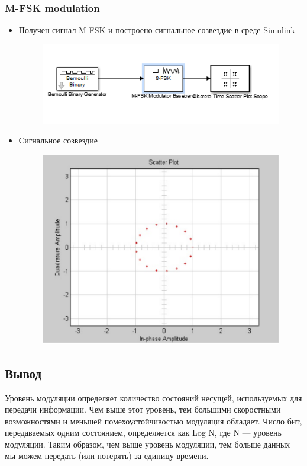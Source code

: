 \documentclass[10pt,a4paper]{article}
\begin{document}
\subsubsection{M-FSK modulation}
\begin{itemize}
\item Получен сигнал M-FSK и построено сигнальное созвездие в среде Simulink
\begin{figure}[h]
\centering
\includegraphics[width=12cm]{sim3_1.png} 
\end{figure}
\item Сигнальное созвездие
\begin{figure}[h]
\centering
\includegraphics[width=12cm]{sim3.png} 
\end{figure}
\end{itemize}
\subsection{Вывод}
Уровень модуляции определяет количество состояний несущей, используемых для передачи информации. Чем выше этот уровень, тем большими скоростными возможностями и меньшей помехоустойчивостью модуляция обладает. Число бит, передаваемых одним состоянием, 
определяется как Log N, где N — уровень модуляции. Таким образом, чем выше уровень модуляции, тем больше данных мы можем передать (или потерять) за единицу времени. 
\end{document}
